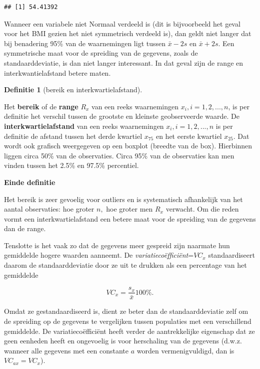 \documentclass[
  12pt,dutch]{book}
\theoremstyle{definition}
\newtheorem{definition}{Definitie}[chapter]
\theoremstyle{definition}
\theoremstyle{definition}
\theoremstyle{definition}
\theoremstyle{remark}
\begin{document}
\begin{verbatim}
## [1] 54.41392
\end{verbatim}

Wanneer een variabele niet Normaal verdeeld is (dit is bijvoorbeeld het
geval voor het BMI gezien het niet symmetrisch verdeeld is), dan
geldt niet langer dat bij benadering 95\% van de waarnemingen ligt tussen \(\bar{x} - 2 s\) en \(\bar{x} + 2 s\). Een symmetrische maat voor de spreiding
van de gegevens, zoals de standaarddeviatie, is dan niet langer interessant.
In dat geval zijn de range en interkwantielafstand betere maten.

\begin{definition}[bereik en interkwartielafstand]
\protect\hypertarget{def:unnamed-chunk-103}{}\label{def:unnamed-chunk-103}~
\end{definition}

Het \textbf{bereik} of de \textbf{range} \(R_x\) van een reeks waarnemingen \(x_i, i=1,2,...,n\), is per definitie het verschil tussen de grootste en
kleinste geobserveerde waarde. De \textbf{interkwartielafstand} van een
reeks waarnemingen \(x_i, i=1,2,...,n\) is per definitie de afstand tussen het derde kwartiel \(x_{75}\) en het eerste kwartiel \(x_{25}\). Dat wordt ook grafisch weergegeven op een boxplot (breedte van de box). Hierbinnen liggen circa 50\% van de observaties. Circa 95\% van de observaties kan men vinden tussen het 2.5\% en 97.5\% percentiel.

\textbf{Einde definitie}

Het bereik is zeer gevoelig voor outliers en is systematisch afhankelijk van
het aantal observaties: hoe groter \(n,\) hoe groter men \(R_x\) verwacht. Om
die reden vormt een interkwartielafstand een betere maat voor de spreiding
van de gegevens dan de range.

Tenslotte is het vaak zo dat de gegevens meer gespreid zijn naarmate hun
gemiddelde hogere waarden aanneemt. De \emph{variatiecoëfficiënt}=\(VC_x\)
standaardiseert daarom de standaarddeviatie door ze uit te drukken als een
percentage van het gemiddelde

\begin{equation*}
VC_x = \frac{s_x}{\bar{x}} 100\%.
\end{equation*}

Omdat ze gestandaardiseerd is, dient ze beter dan de standaarddeviatie zelf om de spreiding op de gegevens te vergelijken tussen populaties met een verschillend gemiddelde. De variatiecoëfficiënt heeft verder de aantrekkelijke eigenschap dat ze geen eenheden heeft en ongevoelig is
voor herschaling van de gegevens (d.w.z. wanneer alle gegevens met een
constante \(a\) worden vermenigvuldigd, dan is \(VC_{ax}=VC_x\)).
\end{document}

